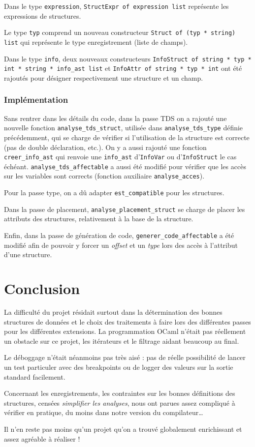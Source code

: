\documentclass[headings=standardclasses,parskip=half]{scrartcl}
\begin{document}
Dans le type \texttt{expression}, \texttt{StructExpr of expression list}
représente les expressions de structures.

Le type \texttt{typ} comprend un nouveau constructeur
\texttt{Struct of (typ * string) list} qui représente le type enregistrement
(liste de champs).

Dans le type \texttt{info}, deux nouveaux constructeurs
\texttt{InfoStruct of string * typ * int * string * info\_ast list} et
\texttt{InfoAttr of string * typ * int}
ont été rajoutés pour désigner respectivement une structure et un champ.

\subsubsection*{Implémentation}

Sans rentrer dans les détails du code, dans la passe TDS on a rajouté
une nouvelle fonction \texttt{analyse\_tds\_struct}, utilisée dans
\texttt{analyse\_tds\_type} définie précédemment, qui se charge de
vérifier si l'utilisation de la structure est correcte (pas de double
déclaration, etc.). On y a aussi rajouté une fonction
\texttt{creer\_info\_ast} qui renvoie une \texttt{info\_ast}
d'\texttt{InfoVar} ou d'\texttt{InfoStruct} le cas échéant.
\texttt{analyse\_tds\_affectable} a aussi été modifié pour vérifier
que les accès sur les variables sont corrects (fonction auxiliaire
\texttt{analyse\_acces}).

Pour la passe type, on a dû adapter \texttt{est\_compatible}
pour les structures.

Dans la passe de placement, \texttt{analyse\_placement\_struct} se
charge de placer les attributs des structures, relativement à la base
de la structure.

Enfin, dans la passe de génération de code,
\texttt{generer\_code\_affectable} a été modifié afin de pouvoir
y forcer un \textit{offset} et un \textit{type} lors des accès
à l'attribut d'une structure.

\section{Conclusion}

La difficulté du projet résidait surtout dans la détermination des
bonnes structures de données et le choix des traitements à faire
lors des différentes passes pour les différentes extensions.
La programmation OCaml n'était pas réellement un obstacle
sur ce projet, les itérateurs et le filtrage aidant beaucoup au
final.

Le déboggage n'était néanmoins pas très aisé : pas de réelle possibilité
de lancer un test particuler avec des breakpoints ou de logger des
valeurs sur la sortie standard facilement.

Concernant les enregistrements, les contraintes sur les bonnes
définitions des structures, censées \textit{simplifier les analyses},
nous ont parues assez compliqué à vérifier en pratique, du moins dans
notre version du compilateur\dots

Il n'en reste pas moins qu'un projet qu'on a trouvé globalement
enrichissant et assez agréable à réaliser !
\end{document}
